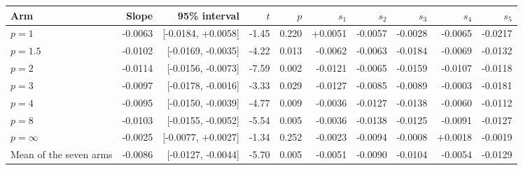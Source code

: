 \begin{tabular}{lrrrrrrrrr}
\toprule
Arm & Slope & 95\% interval & $t$ & $p$ & $s_1$ & $s_2$ & $s_3$ & $s_4$ & $s_5$ \\
\midrule
$p=1$ & -0.0063 & [-0.0184, +0.0058] & -1.45 & 0.220 & +0.0051 & -0.0057 & -0.0028 & -0.0065 & -0.0217 \\
$p=1.5$ & -0.0102 & [-0.0169, -0.0035] & -4.22 & 0.013 & -0.0062 & -0.0063 & -0.0184 & -0.0069 & -0.0132 \\
$p=2$ & -0.0114 & [-0.0156, -0.0073] & -7.59 & 0.002 & -0.0121 & -0.0065 & -0.0159 & -0.0107 & -0.0118 \\
$p=3$ & -0.0097 & [-0.0178, -0.0016] & -3.33 & 0.029 & -0.0127 & -0.0085 & -0.0089 & -0.0003 & -0.0181 \\
$p=4$ & -0.0095 & [-0.0150, -0.0039] & -4.77 & 0.009 & -0.0036 & -0.0127 & -0.0138 & -0.0060 & -0.0112 \\
$p=8$ & -0.0103 & [-0.0155, -0.0052] & -5.54 & 0.005 & -0.0036 & -0.0138 & -0.0125 & -0.0091 & -0.0127 \\
$p=\infty$ & -0.0025 & [-0.0077, +0.0027] & -1.34 & 0.252 & -0.0023 & -0.0094 & -0.0008 & +0.0018 & -0.0019 \\
\midrule
Mean of the seven arms & -0.0086 & [-0.0127, -0.0044] & -5.70 & 0.005 & -0.0051 & -0.0090 & -0.0104 & -0.0054 & -0.0129 \\
\bottomrule
\end{tabular}
